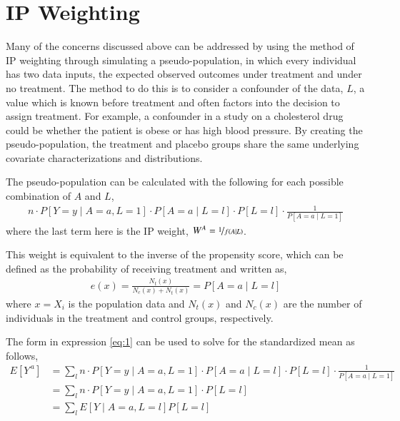 


\section{IP Weighting} \label{IP Weighting} 
Many of the concerns discussed above can be addressed by using the method of IP weighting through simulating a pseudo-population, in which every individual has two data inputs, the expected observed outcomes under treatment and under no treatment.  The method to do this is to consider a confounder of the data, $L$, a value which is known before treatment and often factors into the decision to assign treatment.  For example, a confounder in a study on a cholesterol drug could be whether the patient is obese or has high blood pressure.  By creating the pseudo-population, the treatment and placebo groups share the same underlying covariate characterizations and distributions. 

The pseudo-population can be calculated with the following for each possible combination of $A$ and $L$, 
\begin{align} \label{eq:1}
n\cdot P[Y=y \mid A = a, L= 1] \cdot P[A=a \mid L=l]  \cdot P[L=l] \cdot \frac{1}{P[A = a \mid L = 1]} \end{align}  
where the last term here is the IP weight, $W^{A} = \nicefrac{1}{f(A\mid L)}$.  

This weight is equivalent to the inverse of the propensity score, which can be defined as the probability of receiving treatment and written as,\cite{imbens2015causal}
\begin{align} 
e(x) = \frac{N_t(x)}{N_c(x) + N_t(x)} = P[A=a \mid L = l] 
\end{align} 
where $x = X_i$ is the population data and $N_t(x)$ and $N_c (x)$ are the number of individuals in the treatment and control groups, respectively.  

The form in expression \ref{eq:1} can be used to solve for the standardized mean as follows, 
\begin{align} 
E[Y^{\,a}] &= \sum_l n \cdot P[Y=y \mid A = a, L= 1] \cdot P[A=a \mid L=l]  \cdot P[L=l] \cdot \frac{1}{P[A = a \mid L = 1]} \\ 
&=  \sum_l n \cdot P[Y=y \mid A = a, L= 1] \cdot P[L=l]\\ 
&= \sum_l E[Y \mid A=a, L= l] P[L=l] 
\end{align} 


